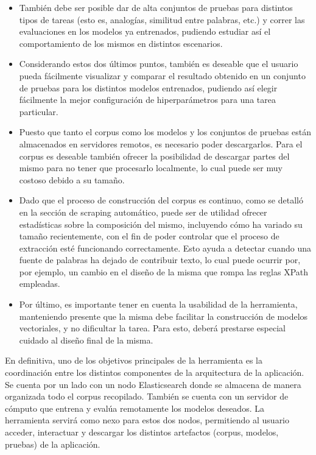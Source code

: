 \begin{itemize}
\item También debe ser posible dar de alta conjuntos de pruebas para distintos tipos de tareas (esto
es, analogías, similitud entre palabras, etc.) y correr las evaluaciones en los modelos ya
entrenados, pudiendo estudiar así el comportamiento de los mismos en distintos escenarios.

\item Considerando estos dos últimos puntos, también es deseable que el usuario pueda fácilmente
visualizar y comparar el resultado obtenido en un conjunto de pruebas para los distintos modelos
entrenados, pudiendo así elegir fácilmente la mejor configuración de hiperparámetros para una tarea
particular.

\item Puesto que tanto el corpus como los modelos y los conjuntos de pruebas están almacenados en
servidores remotos, es necesario poder descargarlos. Para el corpus es deseable también ofrecer la
posibilidad de descargar partes del mismo para no tener que procesarlo localmente, lo cual puede ser
muy costoso debido a su tamaño.

\item Dado que el proceso de construcción del corpus es continuo, como se detalló en la sección de
scraping automático, puede ser de utilidad ofrecer estadísticas sobre la composición del mismo,
incluyendo cómo ha variado su tamaño recientemente, con el fin de poder controlar que el proceso
de extracción esté funcionando correctamente. Esto ayuda a detectar cuando una fuente de palabras
ha dejado de contribuir texto, lo cual puede ocurrir por, por ejemplo, un cambio en el diseño de la
misma que rompa las reglas XPath empleadas.

\item Por último, es importante tener en cuenta la usabilidad de la herramienta, manteniendo presente
que la misma debe facilitar la construcción de modelos vectoriales, y no dificultar la tarea. Para
esto, deberá prestarse especial cuidado al diseño final de la misma.

\end{itemize}

En definitiva, uno de los objetivos principales de la herramienta es la coordinación entre los
distintos componentes de la arquitectura de la aplicación. Se cuenta por un lado con un nodo
Elasticsearch donde se almacena de manera organizada todo el corpus recopilado. También se cuenta
con un servidor de cómputo que entrena y evalúa remotamente los modelos deseados. La herramienta
servirá como nexo para estos dos nodos, permitiendo al usuario acceder, interactuar y descargar los
distintos artefactos (corpus, modelos, pruebas) de la aplicación.


